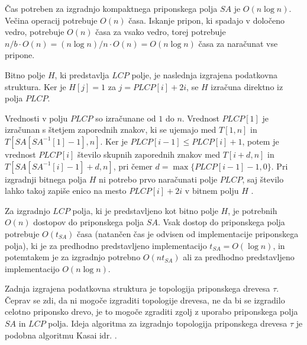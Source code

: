 Čas potreben za izgradnjo kompaktnega priponskega polja $SA$ je $O(n\log{n})$. Večina operacij potrebuje $O(n)$ časa. Iskanje pripon, ki spadajo v določeno vedro, potrebuje $O(n)$ časa za vsako vedro, torej potrebuje $n/b\cdot O(n)=(n\log{n})/n\cdot O(n)=O(n\log{n})$ časa za naračunat vse pripone. 

Bitno polje $H$, ki predstavlja $LCP$ polje, je naslednja izgrajena podatkovna struktura. Ker je $H[j]=1$ za $j=PLCP[i]+2i$, se $H$ izračuna direktno iz polja $PLCP$.

Vrednosti v polju $PLCP$ so izračunane od $1$ do $n$. Vrednost $PLCP[1]$ je izračunan s štetjem zaporednih znakov, ki se ujemajo med $T[1,n]$ in $T[SA[SA^{-1}[1]-1],n]$. Ker je $PLCP[i-1]\le PLCP[i]+1$, potem je vrednost $PLCP[i]$ število skupnih zaporednih znakov med $T[i+d,n]$ in $T[SA[SA^{-1}[i]-1]+d,n]$, pri čemer $d=\max\{PLCP[i-1]-1,0\}$.
Pri izgradnji bitnega polja $H$ ni potrebo prvo naračunati polje $PLCP$, saj število lahko takoj zapiše enico na mesto $PLCP[i]+2i$ v bitnem polju $H$ \cite{Navarro2016}.

Za izgradnjo $LCP$ polja, ki je predstavljeno kot bitno polje $H$, je potrebnih $O(n)$ dostopov do priponskega polja $SA$. Vsak dostop do priponskega polja potrebuje $O(t_{SA})$ časa (natančen čas je odvisen od implementacije priponskega polja), ki je za predhodno predstavljeno implementacijo $t_{SA}= O(\log{n})$, in potemtakem je za izgradnjo potrebno $O(nt_{SA})$ ali za predhodno predstavljeno implementacijo $O(n\log{n})$.

Zadnja izgrajena podatkovna struktura je topologija priponskega drevesa $\tau$. Čeprav se zdi, da ni mogoče izgraditi topologije drevesa, ne da bi se izgradilo celotno priponsko drevo, je to mogoče zgraditi zgolj z uporabo priponskega polja $SA$ in $LCP$ polja. Ideja algoritma za izgradnjo topologija priponskega drevesa $\tau$ je podobna algoritmu Kasai idr. \cite{Kasai2001}.

